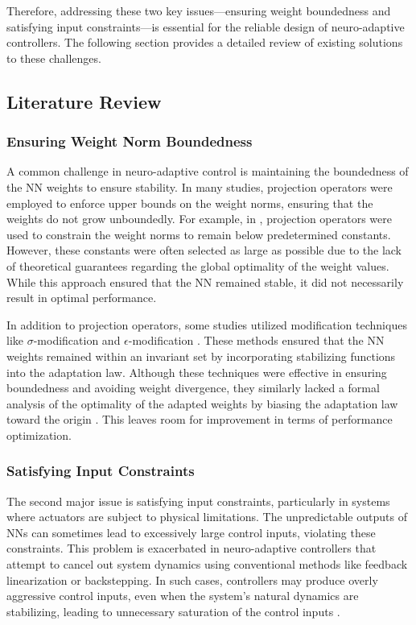 \documentclass[journal]{IEEEtran}
\begin{document}
Therefore, addressing these two key issues—ensuring weight boundedness and satisfying input constraints—is essential for the reliable design of neuro-adaptive controllers. 
The following section provides a detailed review of existing solutions to these challenges.

\subsection{Literature Review}

\subsubsection{Ensuring Weight Norm Boundedness}

A common challenge in neuro-adaptive control is maintaining the boundedness of the NN weights to ensure stability. 
In many studies, projection operators were employed to enforce upper bounds on the weight norms, ensuring that the weights do not grow unboundedly. 
For example, in \cite{Zhou:2023aa,Griffis:2023aa,Patil:2022aa}, projection operators were used to constrain the weight norms to remain below predetermined constants. 
However, these constants were often selected as large as possible due to the lack of theoretical guarantees regarding the global optimality of the weight values. 
While this approach ensured that the NN remained stable, it did not necessarily result in optimal performance.

In addition to projection operators, some studies utilized modification techniques like $\sigma$-modification \cite{Ge:2002aa} and $\epsilon$-modification \cite{Esfandiari:2015aa,Gao:2006aa}. 
These methods ensured that the NN weights remained within an invariant set by incorporating stabilizing functions into the adaptation law. 
Although these techniques were effective in ensuring boundedness and avoiding weight divergence, they similarly lacked a formal analysis of the optimality of the adapted weights by biasing the adaptation law toward the origin \cite{Ryu:2024aa}.
This leaves room for improvement in terms of performance optimization.

\hfill

\subsubsection{Satisfying Input Constraints}

The second major issue is satisfying input constraints, particularly in systems where actuators are subject to physical limitations. 
The unpredictable outputs of NNs can sometimes lead to excessively large control inputs, violating these constraints. 
This problem is exacerbated in neuro-adaptive controllers that attempt to cancel out system dynamics using conventional methods like feedback linearization or backstepping. 
In such cases, controllers may produce overly aggressive control inputs, even when the system's natural dynamics are stabilizing, leading to unnecessary saturation of the control inputs \cite{Khalil:2002aa}.
\end{document}
